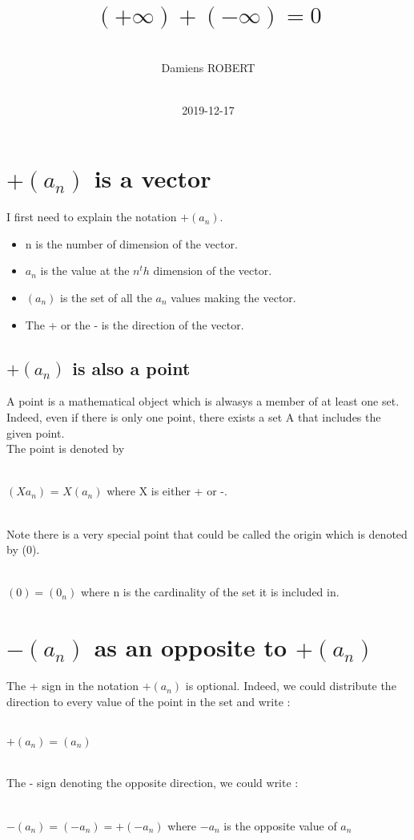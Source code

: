 \documentclass{article}
\title{$(+\infty) + (-\infty) = 0$
}
\date{
~\\
2019-12-17
}
\author{
~\\
Damiens ROBERT
}
\begin{document}
  \maketitle
  \section{$+(a_n)$ is a vector}
  I first need to explain the notation $+(a_n)$.
  \begin{itemize}
    \item
      n is the number of dimension of the vector.
    \item
      $a_n$ is the value at the $n^th$ dimension of the vector.
    \item
      $(a_n)$ is the set of all the $a_n$ values making the vector.
    \item
      The + or the - is the direction of the vector.
  \end{itemize}
  \subsection{$+(a_n)$ is also a point}
    A point is a mathematical object which is alwasys a member of at least one set. Indeed, even if there is only one point, there exists a set A that includes the given point.
    ~\\
    The point is denoted by
    ~\\
    ~\\
    \centerline{
	    $(Xa_n)$ = $X(a_n)$ where X is either + or -.
    }
    ~\\
    Note there is a very special point that could be called the origin which is denoted by (0).
    ~\\
    ~\\
    \centerline{
	    $(0) = (0_n)$ where n is the cardinality of the set it is included in. 
    }
  \section{$-(a_n)$ as an opposite to $+(a_n)$}
    The + sign in the notation $+(a_n)$ is optional. Indeed, we could distribute the direction to every value of the point in the set and write :
    ~\\
    ~\\
    \centerline{
	    $+(a_n) = (a_n)$
    }
    ~\\
    The - sign denoting the opposite direction, we could write :
    ~\\
    ~\\
    \centerline{
	    $-(a_n) = (-a_n) = +(-a_n)$ where $-a_n$ is the opposite value of $a_n$
    }
\end{document}
